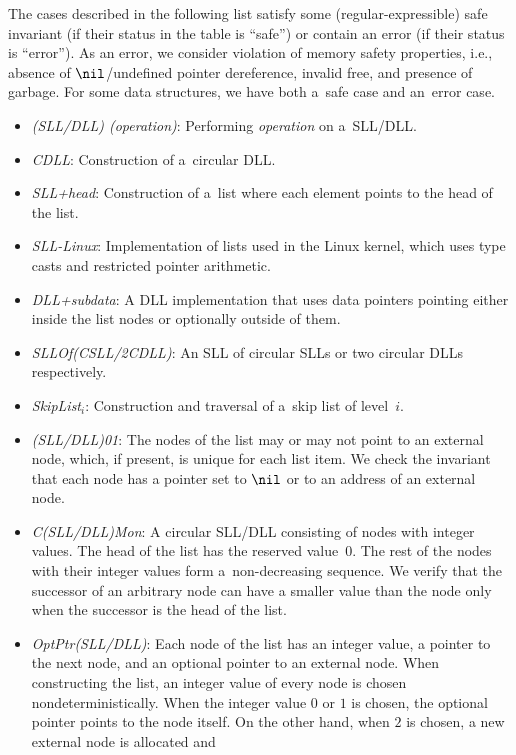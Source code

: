 {The cases described in the following list satisfy some (regular-expressible)
safe invariant (if their status in the table is ``safe'') or contain an error
(if their status is ``error'').
As an error, we consider violation of memory safety properties, i.e.,  absence
of $\nil$/undefined pointer dereference, invalid free, and presence of garbage.
For some data structures, we have both a~safe case and an~error case.
%
\begin{itemize}
  \item \emph{(SLL/DLL) (operation)}: Performing \emph{operation} on a~SLL/DLL.
  \item \emph{CDLL}: Construction of a~circular DLL.
  \item \emph{SLL+head}: Construction of a~list where each element points to
    the head of the list.
  \item \emph{SLL-Linux}: Implementation of lists used in the Linux kernel,
    which uses type casts and restricted pointer arithmetic.
  \item \emph{DLL+subdata}: A DLL implementation that uses data pointers
    pointing either inside the list nodes or optionally outside of them.
  \item \emph{SLLOf(CSLL/2CDLL)}: An SLL of circular SLLs or two circular DLLs
    respectively.
  \item \emph{SkipList$_i$}: Construction and traversal of a~skip
    list of level~$i$.
  \item \emph{(SLL/DLL)01}: The nodes of the list may or may not point to
    an external node, which, if present, is unique for each list item.
    We check the invariant that each node has a pointer set to $\nil$ or
    to an address of an external node.
  \item \emph{C(SLL/DLL)Mon}: A circular SLL/DLL consisting of nodes with integer values.
    The head of the list has the reserved value~$0$. The rest of the nodes with their integer values
    form a~non-decreasing sequence. We verify that the successor of an arbitrary node
    can have a smaller value than the node only when the successor is the head of the list.
  \item \emph{OptPtr(SLL/DLL)}: Each node of the list has an integer value, a pointer to the next node,
    and an optional pointer to an external node. When constructing the list, an integer value of every node
    is chosen nondeterministically. When the integer value $0$ or $1$ is chosen, the optional pointer points
    to the node itself. On the other hand, when $2$ is chosen, a new external node is allocated and

\end{itemize}}
